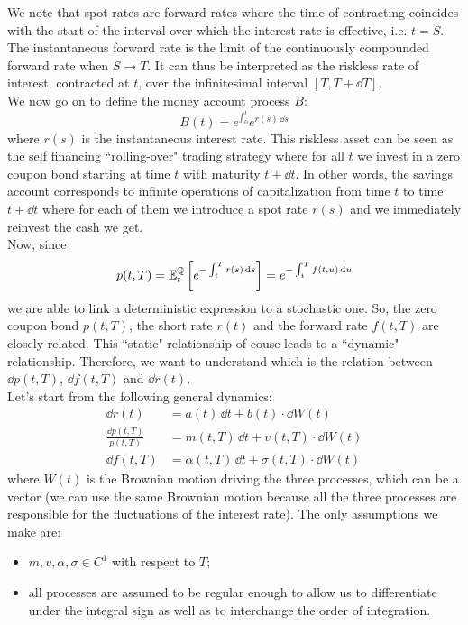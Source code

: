 We note that spot rates are forward rates where the time of contracting coincides with the start of the interval over which the interest rate is effective, i.e. $t = S$. The instantaneous forward rate is the limit of the continuously compounded forward rate when $S \to T$. It can thus be interpreted as the riskless rate of interest, contracted at $t$, over the infinitesimal interval $[T,T +\dd T]$.\\
We now go on to define the money account process $B$:
\begin{equation}
    B(t) = e^{\int_0^t} e^{r(s)\,\dd s}
\end{equation}
where $r(s)$ is the instantaneous interest rate. This riskless asset can be seen as the self financing ``rolling-over" trading strategy where for all $t$ we invest in a zero coupon bond starting at time $t$ with maturity $t+\dd t$. In other words, the savings account corresponds to infinite operations of capitalization from time $t$ to time $t+\dd t$ where for each of them we introduce a spot rate $r(s)$ and we immediately reinvest the cash we get. \\
Now, since
\begin{equation}
    p(t,T) = \mathbb{E}^{\mathbb{Q}}_t\left[e^{-\int_t^T r(s)\,\dd s}\right] = e^{-\int_t^T f(t,u)\,\dd u}
\end{equation}
we are able to link a deterministic expression to a stochastic one. So, the zero coupon bond $p(t,T)$, the short rate $r(t)$ and the forward rate $f(t,T)$ are closely related. This ``static" relationship of couse leads to a ``dynamic" relationship. Therefore, we want to understand which is the relation between $\dd p(t,T)$, $\dd f(t,T)$ and $\dd r(t)$.\\
Let's start from the following general dynamics:
\begin{align}
    \dd r(t) &= a(t)\,\dd t + b(t)\cdot \dd W(t) \\
    \frac{\dd p(t,T)}{p(t,T)} &= m(t,T)\,\dd t + v(t,T)\cdot \dd W(t) \label{zcbdyn} \\
    \dd f(t,T) &= \alpha(t,T)\,\dd t + \sigma(t,T)\cdot \dd W(t) \label{forwratedyn}
\end{align}
where $W(t)$ is the Brownian motion driving the three processes, which can be a vector (we can use the same Brownian motion because all the three processes are responsible for the fluctuations of the interest rate). The only assumptions we make are:
\begin{itemize}
    \item $m, v, \alpha, \sigma \in C^1$ with respect to $T$;
    \item all processes are assumed to be regular enough to allow us to differentiate under the integral sign as well as to interchange the order of integration.
\end{itemize}
